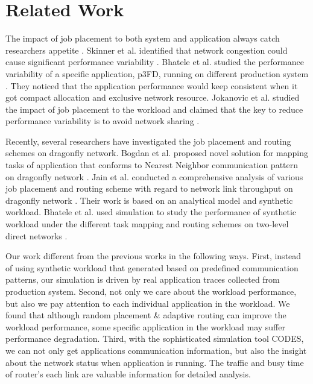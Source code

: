 \documentclass[conference,compsoc]{IEEEtran}
\begin{document}
\section{Related Work}
\label{sec:related work}

The impact of job placement to both system and application always catch researchers appetite \cite{dskinner} \cite{abhinav-sc13} \cite{jose-ipdps15}. Skinner et al. identified that network congestion could cause significant performance variability \cite{dskinner}. Bhatele et al. studied the performance variability of a specific application, p3FD, running on different production system \cite{abhinav-sc13}. They noticed that the application performance would keep consistent when it got compact allocation and exclusive network resource. Jokanovic et al. studied the impact of job placement to the workload and claimed that the key to reduce performance variability is to avoid network sharing \cite{jose-ipdps15}. 

Recently, several researchers have investigated the job placement and routing schemes on dragonfly network. Bogdan et al. proposed novel solution for mapping tasks of application that conforms to Nearest Neighbor communication pattern on dragonfly network \cite{hoefler-hpdc14}. Jain et al. conducted a comprehensive analysis of various job placement and routing scheme with regard to network link throughput on dragonfly network \cite{jain-sc14}. Their work is based on an analytical model and synthetic workload. Bhatele et al. used simulation to study the performance of synthetic workload under the different task mapping and routing schemes on two-level direct networks \cite{bhatele-sc11}.


Our work different from the previous works in the following ways. First, instead of using synthetic workload that generated based on predefined communication patterns, our simulation is driven by real application traces collected from production system. Second, not only we care about the workload performance, but also we pay attention to each individual application in the workload. We found that although random placement \& adaptive routing can improve the workload performance, some specific application in the workload may suffer performance degradation. Third, with the sophisticated simulation tool CODES, we can not only get applications communication information, but also the insight about the network status when application is running. The traffic and busy time of router's each link are valuable information for detailed analysis.
\end{document}
